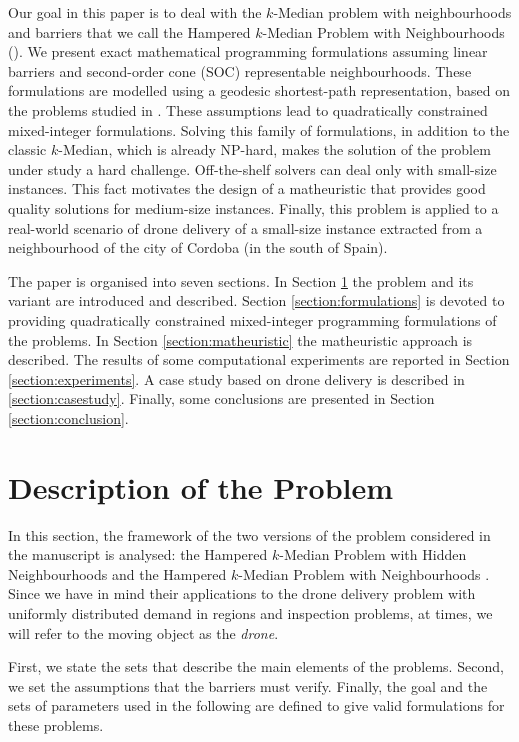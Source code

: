 \documentclass[a4paper,  review, authoryear, 1p.]{elsarticle}
\newcommand{\KMPHN}{{\sf{H-KMPHN}}}
\newcommand{\KMPN}{{\sf{H-KMPN}\xspace }}
\begin{document}
	Our goal in this paper is to deal with the $k$-Median problem with neighbourhoods and barriers that we call the Hampered $k$-Median Problem with Neighbourhoods (\KMPN). We present exact mathematical programming formulations assuming linear barriers and second-order cone (SOC) representable neighbourhoods. These formulations are modelled using a geodesic shortest-path representation, based on the problems studied in \citet{mitchell2017}. These assumptions lead to quadratically constrained mixed-integer formulations. Solving this family of formulations, in addition to the classic $k$-Median, which is already NP-hard, makes the solution of the problem under study a hard challenge. Off-the-shelf solvers can deal only with small-size instances. This fact motivates the design of a matheuristic that provides good quality solutions for medium-size instances. Finally, this problem is applied to a real-world scenario of drone delivery of a small-size instance extracted from a neighbourhood of the city of Cordoba (in the south of Spain).
	
	The paper is organised into seven sections. In Section \ref{section:description} the problem and its variant are introduced and described. Section \ref{section:formulations} is devoted to providing quadratically constrained mixed-integer programming formulations of the problems. In Section \ref{section:matheuristic} the matheuristic approach is described. The results of some computational experiments are reported in Section \ref{section:experiments}. A case study based on drone delivery is described in \ref{section:casestudy}. Finally, some conclusions are presented in Section \ref{section:conclusion}.
	
	
	\section{Description of the Problem}\label{section:description}
	In this section, the framework of the two versions of the problem considered in the manuscript is analysed: the Hampered $k$-Median Problem with Hidden Neighbourhoods \KMPHN\xspace and the Hampered $k$-Median Problem with Neighbourhoods \KMPN. Since we have in mind their applications to the drone delivery problem with uniformly distributed demand in regions and inspection problems, at times, we will refer to the moving object as the \textit{drone}.
	
	First, we state the sets that describe the main elements of the problems. Second, we set the assumptions that the barriers must verify. Finally, the goal and the sets of parameters used in the following are defined to give valid formulations for these problems.
	
\end{document}
